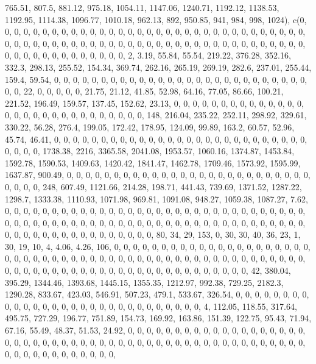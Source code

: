 \documentclass[
]{article}
\begin{document}
765.51, 807.5, 881.12, 975.18, 1054.11, 1147.06, 1240.71, 1192.12,
1138.53, 1192.95, 1114.38, 1096.77, 1010.18, 962.13, 892, 950.85, 941,
984, 998, 1024), c(0, 0, 0, 0, 0, 0, 0, 0, 0, 0, 0, 0, 0, 0, 0, 0, 0, 0,
0, 0, 0, 0, 0, 0, 0, 0, 0, 0, 0, 0, 0, 0, 0, 0, 0, 0, 0, 0, 0, 0, 0, 0,
0, 0, 0, 0, 0, 0, 0, 0, 0, 0, 0, 0, 0, 0, 0, 0, 0, 0, 0, 0, 0, 0, 0, 0,
0, 0, 0, 0, 0, 0, 0, 0, 0, 0, 0, 0, 2, 3.19, 55.84, 55.54, 219.22,
376.28, 352.16, 332.3, 298.13, 255.52, 154.34, 369.74, 262.16, 265.19,
269.19, 282.6, 237.01, 255.44, 159.4, 59.54, 0, 0, 0, 0, 0, 0, 0, 0, 0,
0, 0, 0, 0, 0, 0, 0, 0, 0, 0, 0, 0, 0, 0, 0, 0, 0, 0, 0, 0, 22, 0, 0, 0,
0, 0, 21.75, 21.12, 41.85, 52.98, 64.16, 77.05, 86.66, 100.21, 221.52,
196.49, 159.57, 137.45, 152.62, 23.13, 0, 0, 0, 0, 0, 0, 0, 0, 0, 0, 0,
0, 0, 0, 0, 0, 0, 0, 0, 0, 0, 0, 0, 0, 0, 0, 0, 0, 0, 148, 216.04,
235.22, 252.11, 298.92, 329.61, 330.22, 56.28, 276.4, 199.05, 172.42,
178.95, 124.09, 99.89, 163.2, 60.57, 52.96, 45.74, 46.41, 0, 0, 0, 0, 0,
0, 0, 0, 0, 0, 0, 0, 0, 0, 0, 0, 0, 0, 0, 0, 0, 0, 0, 0, 0, 0, 0, 0, 0,
0, 0, 1738.38, 2216, 3365.58, 2041.08, 1953.57, 1060.16, 1374.87,
1453.84, 1592.78, 1590.53, 1409.63, 1420.42, 1841.47, 1462.78, 1709.46,
1573.92, 1595.99, 1637.87, 900.49, 0, 0, 0, 0, 0, 0, 0, 0, 0, 0, 0, 0,
0, 0, 0, 0, 0, 0, 0, 0, 0, 0, 0, 0, 0, 0, 0, 0, 0, 0, 248, 607.49,
1121.66, 214.28, 198.71, 441.43, 739.69, 1371.52, 1287.22, 1298.7,
1333.38, 1110.93, 1071.98, 969.81, 1091.08, 948.27, 1059.38, 1087.27,
7.62, 0, 0, 0, 0, 0, 0, 0, 0, 0, 0, 0, 0, 0, 0, 0, 0, 0, 0, 0, 0, 0, 0,
0, 0, 0, 0, 0, 0, 0, 0, 0, 0, 0, 0, 0, 0, 0, 0, 0, 0, 0, 0, 0, 0, 0, 0,
0, 0, 0, 0, 0, 0, 0, 0, 0, 0, 0, 0, 0, 0, 0, 0, 0, 0, 0, 0, 0, 0, 0, 0,
0, 0, 0, 0, 0, 0, 0, 0, 0, 0, 80, 34, 29, 153, 0, 30, 30, 40, 36, 23, 1,
30, 19, 10, 4, 4.06, 4.26, 106, 0, 0, 0, 0, 0, 0, 0, 0, 0, 0, 0, 0, 0,
0, 0, 0, 0, 0, 0, 0, 0, 0, 0, 0, 0, 0, 0, 0, 0, 0, 0, 0, 0, 0, 0, 0, 0,
0, 0, 0, 0, 0, 0, 0, 0, 0, 0, 0, 0, 0, 0, 0, 0, 0, 0, 0, 0, 0, 0, 0, 0,
0, 0, 0, 0, 0, 0, 0, 0, 0, 0, 0, 0, 0, 0, 0, 0, 0, 0, 42, 380.04,
395.29, 1344.46, 1393.68, 1445.15, 1355.35, 1212.97, 992.38, 729.25,
2182.3, 1290.28, 833.67, 423.03, 546.91, 507.23, 479.1, 533.67, 326.54,
0, 0, 0, 0, 0, 0, 0, 0, 0, 0, 0, 0, 0, 0, 0, 0, 0, 0, 0, 0, 0, 0, 0, 0,
0, 0, 0, 0, 0, 4, 112.05, 118.55, 317.64, 495.75, 727.29, 196.77,
751.89, 154.73, 169.92, 163.86, 151.39, 122.75, 95.43, 71.94, 67.16,
55.49, 48.37, 51.53, 24.92, 0, 0, 0, 0, 0, 0, 0, 0, 0, 0, 0, 0, 0, 0, 0,
0, 0, 0, 0, 0, 0, 0, 0, 0, 0, 0, 0, 0, 0, 0, 0, 0, 0, 0, 0, 0, 0, 0, 0,
0, 0, 0, 0, 0, 0, 0, 0, 0, 0, 0, 0, 0, 0, 0, 0, 0, 0, 0, 0, 0, 0, 0, 0,
\end{document}

